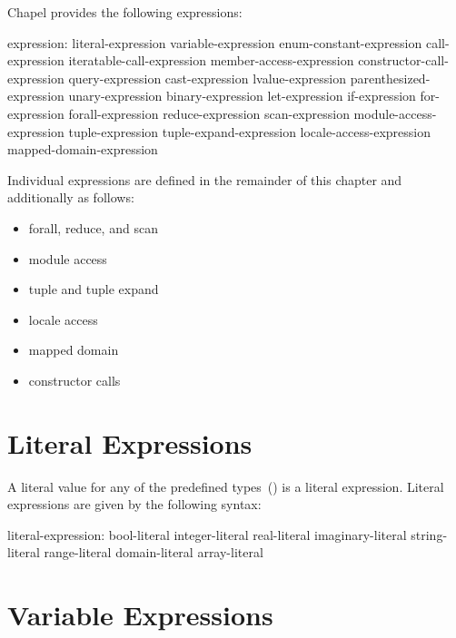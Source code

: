 \label{Expressions}

Chapel provides the following expressions:

\begin{syntax}
expression:
  literal-expression
  variable-expression
  enum-constant-expression
  call-expression
  iteratable-call-expression
  member-access-expression
  constructor-call-expression
  query-expression
  cast-expression
  lvalue-expression
  parenthesized-expression
  unary-expression
  binary-expression
  let-expression
  if-expression
  for-expression
  forall-expression
  reduce-expression
  scan-expression
  module-access-expression
  tuple-expression
  tuple-expand-expression
  locale-access-expression
  mapped-domain-expression
\end{syntax}

Individual expressions are defined in the remainder of this chapter
and additionally as follows:

\begin{itemize}
\item forall, reduce, and scan 
\item module access 
\item tuple and tuple expand 
\item locale access 
\item mapped domain 
\item constructor calls 
\end{itemize}



\section{Literal Expressions}
\label{Literal_Expressions}

A literal value for any of the predefined
types~() is a literal expression.
Literal expressions are given by the following syntax:
\begin{syntax}
literal-expression:
  bool-literal
  integer-literal
  real-literal
  imaginary-literal
  string-literal
  range-literal
  domain-literal
  array-literal
\end{syntax}

\section{Variable Expressions}
\label{Variable_Expressions}

